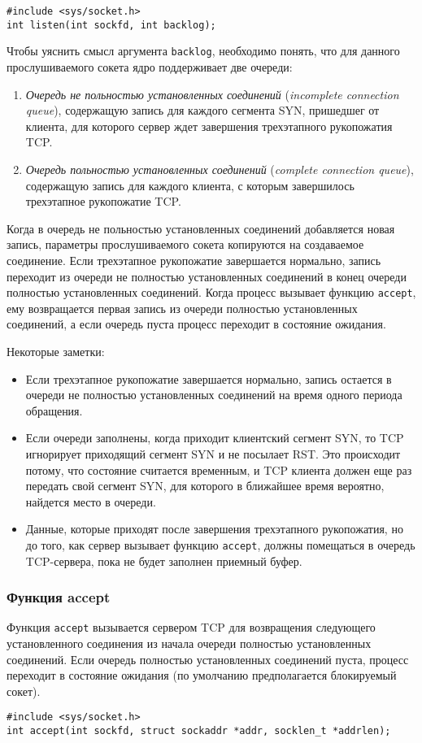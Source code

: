 \lstset{language=C,caption=}
\begin{lstlisting}
#include <sys/socket.h>
int listen(int sockfd, int backlog);
\end{lstlisting}

Чтобы уяснить смысл аргумента \lstinline{backlog}, необходимо понять, что для данного прослушиваемого сокета ядро поддерживает две очереди:
\begin{enumerate}
  \item \emph{Очередь не польностью установленных соединений} (\emph{incomplete connection queue}), содержащую запись для каждого сегмента SYN, пришедшег от клиента, для которого сервер ждет завершения трехэтапного рукопожатия TCP.
  \item \emph{Очередь польностью установленных соединений} (\emph{complete connection queue}), содержащую запись для каждого клиента, с которым завершилось трехэтапное рукопожатие TCP.
\end{enumerate}

Когда в очередь не польностью установленных соединений добавляется новая запись, параметры прослушиваемого сокета копируются на создаваемое соединение. Если трехэтапное рукопожатие завершается нормально, запись переходит из очереди не полностью установленных соединений в конец очереди полностью установленных соединений. Когда процесс вызывает функцию \lstinline{accept}, ему возвращается первая запись из очереди полностью установленных соединений, а если очередь пуста процесс переходит в состояние ожидания.

Некоторые заметки:
\begin{itemize}
  \item Если трехэтапное рукопожатие завершается нормально, запись остается в очереди не полностью установленных соединений на время одного периода обращения.
  \item Если очереди заполнены, когда приходит клиентский сегмент SYN, то TCP игнорирует приходящий сегмент SYN и не посылает RST. Это происходит потому, что состояние считается временным, и TCP клиента должен еще раз передать свой сегмент SYN, для которого в ближайшее время вероятно, найдется место в очереди.
  \item Данные, которые приходят после завершения трехэтапного рукопожатия, но до того, как сервер вызывает функцию \lstinline{accept}, должны помещаться в очередь TCP-сервера, пока не будет заполнен приемный буфер.
\end{itemize}

\subsubsection{Функция accept}
Функция \lstinline{accept} вызывается сервером TCP для возвращения следующего установленного соединения из начала очереди полностью установленных соединений. Если очередь полностью установленных соединений пуста, процесс переходит в состояние ожидания (по умолчанию предполагается блокируемый сокет).
\lstset{language=C,caption=}
\begin{lstlisting}
#include <sys/socket.h>
int accept(int sockfd, struct sockaddr *addr, socklen_t *addrlen);
\end{lstlisting}

